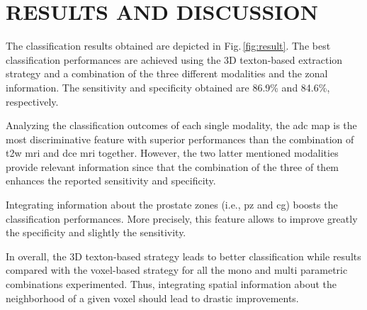 \section{RESULTS AND DISCUSSION}\label{sec:results}



The classification results obtained are depicted in Fig.\,\ref{fig:result}. The best classification performances are achieved using the 3D texton-based extraction strategy and a combination of the three different modalities and the zonal information. The sensitivity and specificity obtained are 86.9\% and 84.6\%, respectively.

Analyzing the classification outcomes of each single modality, the \ac{adc} map is the most discriminative feature with superior performances than the combination of \ac{t2w} \ac{mri} and \ac{dce} \ac{mri} together. However, the two latter mentioned modalities provide relevant information since that the combination of the three of them enhances the reported sensitivity and specificity. 

Integrating information about the prostate zones (i.e., \ac{pz} and \ac{cg}) boosts the classification performances. More precisely, this feature allows to improve greatly the specificity and slightly the sensitivity. 

In overall, the 3D texton-based strategy leads to better classification while results compared with the voxel-based strategy for all the mono and multi parametric combinations experimented. Thus, integrating spatial information about the neighborhood of a given voxel should lead to drastic improvements.

